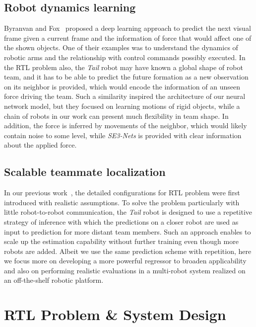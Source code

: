\documentclass[letterpaper, 10 pt, conference]{ieeeconf}  %
\begin{document}
	\subsection{Robot dynamics learning}
	\label{sec:robot_dynamics_learning}

	Byranvan and Fox~\cite{BF17} proposed a deep learning approach
	to predict the next visual frame given a current frame and the information
	of force that would affect one of the shown objects. One of their examples was
	to understand the dynamics of robotic arms and the relationship with control
	commands possibly executed. In the RTL problem also, the \emph{Tail} robot may
	have known
	a global shape of robot team, and it has to be able to predict the future
	formation as a new observation on its neighbor is provided, which would encode
	the information of an unseen force driving the team. Such a similarity inspired
	the architecture of our neural network model, but they focused on learning
	motions of rigid objects, while a chain of robots in our work can present
	much flexibility in team shape. In addition, the force is inferred by
	movements of the neighbor, which would likely contain noise to some level, while
	\emph{SE3-Nets} is provided with clear information about the applied force.

	\subsection{Scalable teammate localization}
	\label{sec:scalable_teammate_localization}

	In our previous work~\cite{CPR17}, the detailed configurations for RTL
	problem were first introduced with realistic assumptions.
	To solve the problem particularly with little robot-to-robot communication,
	the \emph{Tail} robot is designed to use a repetitive strategy of inference
	with which the predictions on a closer robot are used as input to
	prediction for more distant team members. Such an approach enables to scale
	up the estimation capability without further training even though more robots are
	added. Albeit we use the same prediction scheme with repetition, here we focus
	more on developing a more powerful regressor to broaden applicability and
	also on performing realistic evaluations in a multi-robot system realized on
	an off-the-shelf robotic platform.


	\section{RTL Problem \& System Design}
	\label{sec:rtl_problem}
\end{document}
